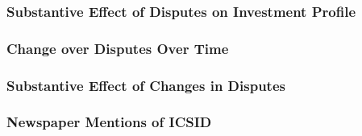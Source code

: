 \documentclass[10pt]{beamer}
\begin{document}
\begin{frame}
\frametitle{Substantive Effect of Disputes on Investment Profile}

\begin{figure}[ht]
	\centering
	\resizebox{1\textwidth}{!}{}	
\end{figure}

\end{frame}

\begin{frame}
\frametitle{Change over Disputes Over Time}

\begin{figure}[ht]
	\centering
	\resizebox{1\textwidth}{!}{}	
\end{figure}

\end{frame}

\begin{frame}
\frametitle{Substantive Effect of Changes in Disputes}

\begin{figure}[ht]
	\centering
	\resizebox{1\textwidth}{!}{}	
\end{figure}

\end{frame}

\begin{frame}
\frametitle{Newspaper Mentions of ICSID}

\begin{figure}[ht]
	\centering
	\resizebox{1\textwidth}{!}{}
\end{figure}

\end{frame}


\end{document}
